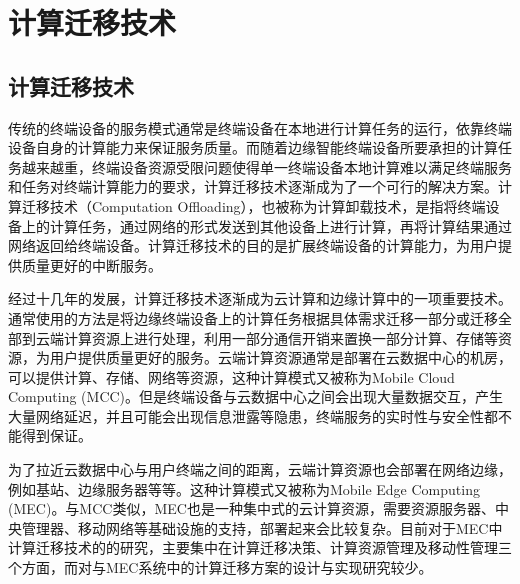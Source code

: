 

\section{计算迁移技术}\label{sec:related_work_computing_offloading}
\subsection{计算迁移技术}

传统的终端设备的服务模式通常是终端设备在本地进行计算任务的运行，依靠终端设备自身的计算能力来保证服务质量。而随着边缘智能终端设备所要承担的计算任务越来越重，终端设备资源受限问题使得单一终端设备本地计算难以满足终端服务和任务对终端计算能力的要求，计算迁移技术逐渐成为了一个可行的解决方案\cite{张文丽2016智能移动终端计算迁移研究}。计算迁移技术（Computation Offloading），也被称为计算卸载技术，是指将终端设备上的计算任务，通过网络的形式发送到其他设备上进行计算，再将计算结果通过网络返回给终端设备。计算迁移技术的目的是扩展终端设备的计算能力，为用户提供质量更好的中断服务。

经过十几年的发展，计算迁移技术逐渐成为云计算和边缘计算中的一项重要技术\cite{崔勇2017移动云计算研究进展与趋势}。通常使用的方法是将边缘终端设备上的计算任务根据具体需求迁移一部分或迁移全部到云端计算资源上进行处理，利用一部分通信开销来置换一部分计算、存储等资源，为用户提供质量更好的服务\cite{徐乃凡2018面向边缘云高效能的移动终端计算迁移方法}。云端计算资源通常是部署在云数据中心的机房，可以提供计算、存储、网络等资源，这种计算模式又被称为Mobile Cloud Computing (MCC)\cite{barbarossa2014communicating}。但是终端设备与云数据中心之间会出现大量数据交互，产生大量网络延迟，并且可能会出现信息泄露等隐患，终端服务的实时性与安全性都不能得到保证\cite{shi2016edge}。

为了拉近云数据中心与用户终端之间的距离，云端计算资源也会部署在网络边缘，例如基站、边缘服务器等等。这种计算模式又被称为Mobile Edge Computing (MEC)\cite{董浩2019移动边缘计算环境下服务工作流的计算卸载,mach2017mobile}。与MCC类似，MEC也是一种集中式的云计算资源，需要资源服务器、中央管理器、移动网络等基础设施的支持，部署起来会比较复杂。目前对于MEC中计算迁移技术的的研究，主要集中在计算迁移决策、计算资源管理及移动性管理三个方面，而对与MEC系统中的计算迁移方案的设计与实现研究较少\cite{谢人超2018移动边缘计算卸载技术综述}。

